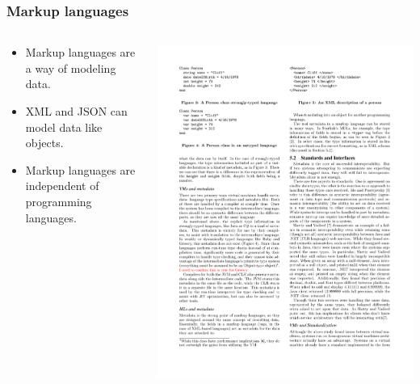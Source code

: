 \documentclass{beamer}
\newcommand{\linespace}{\vskip 0.25cm}
\begin{document}
\begin{frame}
  \frametitle{Markup languages}
  
  \begin{columns}
  \begin{column}{0.5\textwidth}
  \begin{itemize}
	\item Markup languages are a way of modeling data.
	\item XML and JSON can model data like objects.
	\item Markup languages are independent of programming languages.
  \end{itemize}
  \end{column}

  \begin{column}{0.55\textwidth}
   \includegraphics[scale=1]{graphics/XMLCliff.pdf}
   \linespace
   \linespace

\end{column}
\end{columns}
\end{frame}
\end{document}
